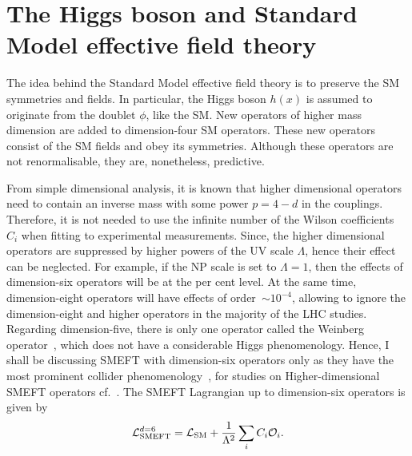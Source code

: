 \section{The Higgs boson and Standard Model effective field theory \label{sec:smeft}}
\par  The idea behind the Standard Model effective field theory is to preserve the SM symmetries and fields. In particular, the Higgs boson $h(x)$ is assumed to originate from the doublet $\phi$, like the SM.  New operators of higher mass dimension are added to dimension-four SM operators. These new operators consist of the SM fields and obey its symmetries. Although these operators are not renormalisable, they are, nonetheless, predictive.
 \par From simple dimensional analysis, it is known that higher dimensional operators need to contain an inverse mass with some power $p=4-d$ in the couplings. Therefore, it is not needed to use the infinite number of the Wilson coefficients~$C_i$ when fitting to experimental measurements. Since, the higher dimensional operators are suppressed by higher powers of the UV scale $\Lambda$, hence their effect can be neglected. For example, if the NP scale is set to  $\Lambda =1$, then the effects of dimension-six operators will be at the per cent level. At the same time, dimension-eight operators will have effects of order~$\sim10^{-4}$, allowing to ignore the dimension-eight and higher operators in the majority of the LHC studies.  Regarding dimension-five, there is only one operator called the Weinberg operator~\cite{PhysRevLett.43.1566}, which does not have a considerable Higgs phenomenology. Hence, I shall be discussing SMEFT with dimension-six operators only as  they have the most prominent collider phenomenology~\cite{BUCHMULLER1986621,Hagiwara:1993ck}, for studies on Higher-dimensional SMEFT operators cf.~\cite{Lehman:2014jma,Lehman:2015coa,Henning:2015alf,Aguilar-Saavedra:2010uur}. The SMEFT Lagrangian up to dimension-six operators is given by
\begin{equation}
	\mathcal{L}_{\mathrm{SMEFT}}^{d=6}=\mathcal{L}_{\mathrm{SM}} + \frac{1}{\Lambda^2}\sum_i C_i  {\cal O}_i.
	\label{smeftdim6}
\end{equation}

